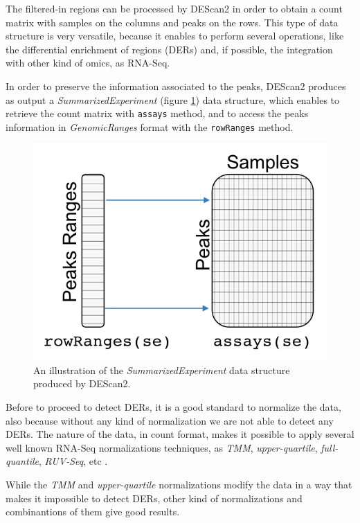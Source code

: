 The filtered-in regions can be processed by DEScan2 in order to obtain a count matrix with samples on the columns and peaks on the rows.
This type of data structure is very versatile, because it enables to perform several operations, like the differential enrichment of regions (DERs) and, if possible, the integration with other kind of omics, as RNA-Seq.

In order to preserve the information associated to the peaks, DEScan2 produces as output a \textit{SummarizedExperiment} (figure \ref{fig:countsdescan}) data structure, which enables to retrieve the count matrix with \lstinline{assays} method, and to access the peaks information in \textit{GenomicRanges} format with the \lstinline{rowRanges} method.

\begin{figure}[H]
\centering
\includegraphics[keepaspectratio]{img/descan2/counts.png}
\caption[DEScan2 counts illustration]{An illustration of the \textit{SummarizedExperiment} data structure produced by DEScan2.}
\label{fig:countsdescan}
\centering
\end{figure}

Before to proceed to detect DERs, it is a good standard to normalize the data, also because without any kind of normalization we are not able to detect any DERs.
The nature of the data, in count format, makes it possible to apply several well known RNA-Seq normalizations techniques, as \textit{TMM}, \textit{upper-quartile}, \textit{full-quantile}, \textit{RUV-Seq}, etc \cite{Risso2014, Robinson2010, Dillies2013}.

While the \textit{TMM} and \textit{upper-quartile} normalizations modify the data in a way that makes it impossible to detect DERs, other kind of normalizations and combinantions of them give good results.

